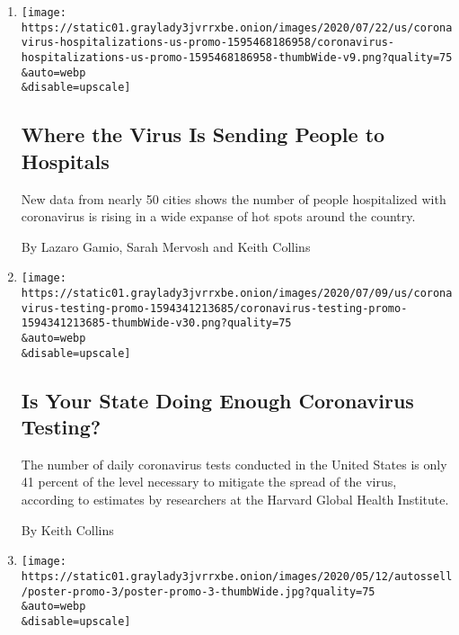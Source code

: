 \begin{enumerate}
\def\labelenumi{\arabic{enumi}.}
\item
  \href{/interactive/2020/07/23/us/coronavirus-hospitalizations-us.html}{}

  \texttt{[image: https://static01.graylady3jvrrxbe.onion/images/2020/07/22/us/coronavirus-hospitalizations-us-promo-1595468186958/coronavirus-hospitalizations-us-promo-1595468186958-thumbWide-v9.png?quality=75\\\&auto=webp\\\&disable=upscale]}

  \hypertarget{where-the-virus-is-sending-people-to-hospitals}{%
  \subsection{Where the Virus Is Sending People to
  Hospitals}\label{where-the-virus-is-sending-people-to-hospitals}}

  New data from nearly 50 cities shows the number of people hospitalized
  with coronavirus is rising in a wide expanse of hot spots around the
  country.

  By Lazaro Gamio, Sarah Mervosh and Keith Collins
\item
  \href{/interactive/2020/us/coronavirus-testing.html}{}

  \texttt{[image: https://static01.graylady3jvrrxbe.onion/images/2020/07/09/us/coronavirus-testing-promo-1594341213685/coronavirus-testing-promo-1594341213685-thumbWide-v30.png?quality=75\\\&auto=webp\\\&disable=upscale]}

  \hypertarget{is-your-state-doing-enough-coronavirus-testing}{%
  \subsection{Is Your State Doing Enough Coronavirus
  Testing?}\label{is-your-state-doing-enough-coronavirus-testing}}

  The number of daily coronavirus tests conducted in the United States
  is only 41 percent of the level necessary to mitigate the spread of
  the virus, according to estimates by researchers at the Harvard Global
  Health Institute.

  By Keith Collins
\item
  \href{/interactive/2020/05/12/us/coronavirus-testing-white-house.html}{}

  \texttt{[image: https://static01.graylady3jvrrxbe.onion/images/2020/05/12/autossell/poster-promo-3/poster-promo-3-thumbWide.jpg?quality=75\\\&auto=webp\\\&disable=upscale]}


\end{enumerate}
